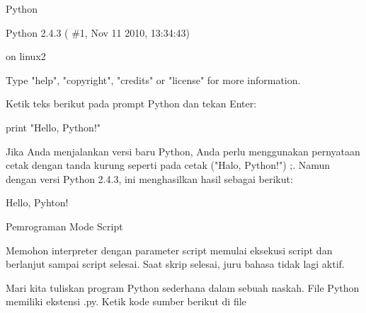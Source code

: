 \vspace{14pt}
\noindent 
{\fontsize{14pt}{14pt}\selectfont Python \\} \par
\vspace{14pt}
\noindent 
{\fontsize{14pt}{14pt}\selectfont Python 2.4.3 ( $  \#  $1, Nov 11 2010, 13:34:43) \\} \par
\noindent 
{\fontsize{14pt}{14pt} on linux2 \\} \par
\noindent 
{\fontsize{14pt}{14pt}\selectfont Type "help", "copyright", "credits" or "license" for more information. \\} \par
\vspace{14pt}
\noindent 
{\fontsize{14pt}{14pt}\selectfont Ketik teks berikut pada prompt Python dan tekan Enter: \\} \par
\vspace{14pt}
\noindent 
{\fontsize{14pt}{14pt}\selectfont print "Hello, Python!" \\} \par
\vspace{14pt}
\noindent 
{\fontsize{14pt}{14pt}\selectfont Jika Anda menjalankan versi baru Python, Anda perlu menggunakan pernyataan cetak dengan tanda kurung seperti pada cetak ("Halo, Python!") ;. Namun dengan versi Python 2.4.3, ini menghasilkan hasil sebagai berikut: \\} \par
\vspace{14pt}
\noindent 
{\fontsize{14pt}{14pt}\selectfont Hello, Pyhton! \\} \par
\vspace{14pt}
\noindent 
{\fontsize{14pt}{14pt}\selectfont Pemrograman Mode Script \\} \par
\noindent 
{\fontsize{14pt}{14pt}\selectfont Memohon interpreter dengan parameter script memulai eksekusi script dan berlanjut sampai script selesai. Saat skrip selesai, juru bahasa tidak lagi aktif. \\} \par
\vspace{14pt}
\noindent 
{\fontsize{14pt}{14pt}\selectfont Mari kita tuliskan program Python sederhana dalam sebuah naskah. File Python memiliki ekstensi .py. Ketik kode sumber berikut di file \\} \par
